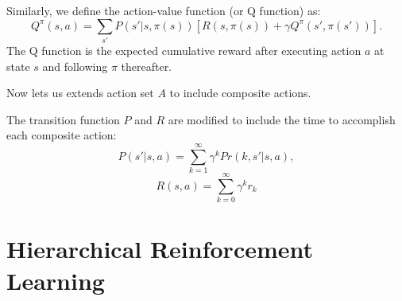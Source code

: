 Similarly, we define the action-value function (or Q function) as:
\begin{equation}
    Q^{\pi}(s, a) = \sum_{s'}P(s'|s, \pi(s))[R(s, \pi(s)) + \gamma Q^{\pi}(s', \pi(s'))].
    \label{eq:Q}
\end{equation}
The Q function is the expected cumulative reward after executing action $a$ at state $s$ and following
$\pi$ thereafter.

Now lets us extends action set $A$ to include composite actions.


The transition function $P$ and $R$ are modified to include the time to accomplish each composite action:
\begin{equation}
    P(s'|s, a) = \sum^{\infty}_{k=1} \gamma^k Pr(k, s'|s, a),
    \label{eq:multiProb}
\end{equation}
\begin{equation}
    R(s, a) = \sum^{\infty}_{k=0} \gamma^k r_k
\end{equation}



\section{Hierarchical Reinforcement Learning}

